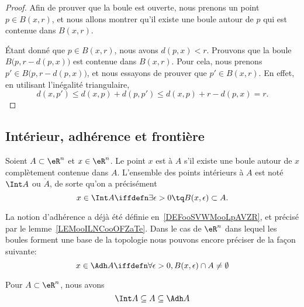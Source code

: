 \begin{proof}
    Afin de prouver que la boule est ouverte, nous prenons un point $p\in B(x,r)$, et nous allons montrer qu'il existe une boule autour de $p$ qui est contenue dans $B(x,r)$.

    Étant donné que $p\in B(x,r)$, nous avons $d(p,x)<r$. Prouvons que la boule $B\big(p,r-d(p,x)\big)$ est contenue dans $B(x,r)$. Pour cela, nous prenons $p'\in B\big(p,r-d(p,x)\big)$, et nous essayons de prouver que $p'\in B(x,r)$. En effet, en utilisant l'inégalité triangulaire,
    \begin{equation}
	    d(x,p')\leq d(x,p)+d(p,p')\leq d(x,p)+r-d(p,x)=r.
    \end{equation}
\end{proof}

\subsection{Intérieur, adhérence et frontière}

\begin{definition}
  Soient $A \subset \eR^n$ et $x \in \eR^n$. Le point $x$ est  à $A$ s'il existe une boule autour de $x$ complètement contenue dans $A$. L'ensemble des points intérieurs à $A$ est noté $\Int A$ ou $\mathring A$, de sorte qu'on a précisément
  \begin{equation*}
    x \in \Int A \iffdefn  \exists \epsilon > 0 \tq
    B(x,\epsilon) \subset A.
  \end{equation*}
\end{definition}

\begin{normaltext}

La notion d'adhérence a déjà été définie en~\ref{DEFooSVWMooLpAVZR}, et précisé par le lemme~\ref{LEMooILNCooOFZaTe}. Dans le cas de \( \eR^n\) dans lequel les boules forment une base de la topologie nous pouvons encore préciser de la façon suivante:
\begin{equation}
	x \in \Adh A \iffdefn \forall \epsilon > 0, B(x,\epsilon) \cap A \neq \emptyset
\end{equation}
\end{normaltext}

\begin{proposition}
Pour $A \subset \eR^n$, nous avons
\begin{equation*}
	\Int A \subseteq A  \subseteq \Adh A
\end{equation*}
\end{proposition}

